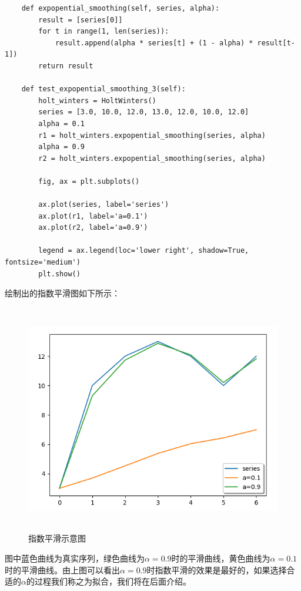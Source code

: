 \documentclass{article}
\begin{document}
\begin{lstlisting}
    def expopential_smoothing(self, series, alpha):
        result = [series[0]]
        for t in range(1, len(series)):
            result.append(alpha * series[t] + (1 - alpha) * result[t-1])
        return result
        
    def test_expopential_smoothing_3(self):
        holt_winters = HoltWinters()
        series = [3.0, 10.0, 12.0, 13.0, 12.0, 10.0, 12.0]
        alpha = 0.1
        r1 = holt_winters.expopential_smoothing(series, alpha)
        alpha = 0.9
        r2 = holt_winters.expopential_smoothing(series, alpha)
        
        fig, ax = plt.subplots()
        
        ax.plot(series, label='series')
        ax.plot(r1, label='a=0.1')
        ax.plot(r2, label='a=0.9')
        
        legend = ax.legend(loc='lower right', shadow=True, fontsize='medium')
        plt.show()        
\end{lstlisting}
绘制出的指数平滑图如下所示：
\begin{figure}[H]
	\caption{指数平滑示意图}
	\label{f000070}
	\centering
	\includegraphics[height=10cm]{images/f000070}
\end{figure}
图中蓝色曲线为真实序列，绿色曲线为$\alpha=0.9$时的平滑曲线，黄色曲线为$\alpha=0.1$时的平滑曲线。由上图可以看出$\alpha=0.9$时指数平滑的效果是最好的，如果选择合适的$\alpha$的过程我们称之为拟合，我们将在后面介绍。
\end{document}
